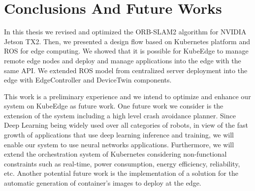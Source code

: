 \chapter*{Conclusions And Future Works}
In this thesis we revised and optimized the ORB-SLAM2 algorithm for NVIDIA Jetson TX2. Then, we presented a design flow based on Kubernetes platform and ROS for edge computing. We showed that it is possible for KubeEdge to manage remote edge nodes and deploy and manage applications into the edge with the same API.
We extended ROS model from centralized server deployment into the edge with EdgeController and DeviceTwin components.

This work is a preliminary experience and we intend to optimize and enhance our system on KubeEdge as future work.
One future work we consider is the extension of the system including a high level crash avoidance planner.
Since Deep Learning being widely used over all categories of robots, in view of the fast growth of applications that use deep learning inference and training, we will enable our system to use neural networks applications.
Furthermore, we will extend the orchestration system of Kubernetes considering non-functional constraints such as real-time, power consumption, energy efficiency, reliability, etc.
Another potential future work is the implementation of a solution for the automatic generation of container's images to deploy at the edge.

\clearpage
\thispagestyle{empty}












% 

